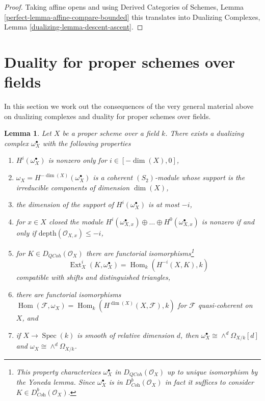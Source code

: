 \documentclass{stacks-project}
\theoremstyle{plain}
\newtheorem{lemma}[subsection]{Lemma}
\theoremstyle{definition}
\theoremstyle{remark}
\numberwithin{equation}{subsection}
\def\Spec{\mathop{\mathrm{Spec}}}
\def\Hom{\mathop{\mathrm{Hom}}\nolimits}
\def\Ext{\mathop{\mathrm{Ext}}\nolimits}
\def\QCoh{\mathit{QCoh}}
\begin{document}
\begin{proof}
Taking affine opens and using
Derived Categories of Schemes, Lemma \ref{perfect-lemma-affine-compare-bounded}
this translates into
Dualizing Complexes, Lemma \ref{dualizing-lemma-descent-ascent}.
\end{proof}







\section{Duality for proper schemes over fields}
\label{section-duality-proper-over-field}

\noindent
In this section we work out the consequences of the very general
material above on dualizing complexes and duality for proper schemes
over fields.

\begin{lemma}
\label{lemma-duality-proper-over-field}
Let $X$ be a proper scheme over a field $k$. There exists a dualizing complex
$\omega_X^\bullet$ with the following properties
\begin{enumerate}
\item $H^i(\omega_X^\bullet)$ is nonzero only for $i \in [-\dim(X), 0]$,
\item $\omega_X = H^{-\dim(X)}(\omega_X^\bullet)$ is a coherent
$(S_2)$-module whose support is the irreducible components
of dimension $\dim(X)$,
\item the dimension of the support of $H^i(\omega_X^\bullet)$ is at most $-i$,
\item for $x \in X$ closed the module
$H^i(\omega_{X, x}^\bullet) \oplus \ldots \oplus H^0(\omega_{X, x}^\bullet)$
is nonzero if and only if $\text{depth}(\mathcal{O}_{X, x}) \leq -i$,
\item for $K \in D_\QCoh(\mathcal{O}_X)$ there are functorial
isomorphisms\footnote{This property
characterizes $\omega_X^\bullet$ in $D_\QCoh(\mathcal{O}_X)$
up to unique isomorphism by the Yoneda lemma. Since $\omega_X^\bullet$
is in $D^b_{\textit{Coh}}(\mathcal{O}_X)$ in fact it suffices to consider
$K \in D^b_{\textit{Coh}}(\mathcal{O}_X)$.}
$$
\Ext^i_X(K, \omega_X^\bullet) = \Hom_k(H^{-i}(X, K), k)
$$
compatible with shifts and distinguished triangles,
\item there are functorial isomorphisms
$\Hom(\mathcal{F}, \omega_X) = \Hom_k(H^{\dim(X)}(X, \mathcal{F}), k)$
for $\mathcal{F}$ quasi-coherent on $X$, and
\item if $X \to \Spec(k)$ is smooth of relative dimension $d$,
then $\omega_X^\bullet \cong \wedge^d\Omega_{X/k}[d]$ and
$\omega_X \cong \wedge^d\Omega_{X/k}$.
\end{enumerate}
\end{lemma}
\end{document}
